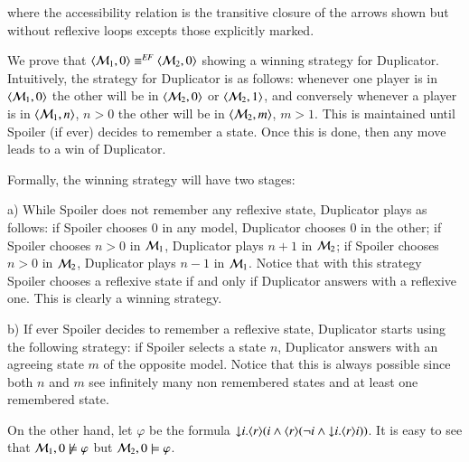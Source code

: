 \begin{pf}
\begin{center}
\end{center}

\noindent where the accessibility relation is the
transitive closure of the arrows shown but without reflexive
loops excepts those explicitly marked.


We prove that $\langle \mathcal{M}_1,0 \rangle\equiv^{\mathit{EF}} \langle \mathcal{M}_2,0 \rangle$ showing a winning
strategy for Duplicator. Intuitively, the strategy for Duplicator
is as follows: whenever one player is in
$\langle \mathcal{M}_1,0 \rangle$ the other will be in $\langle \mathcal{M}_2,0 \rangle$ or
$\langle \mathcal{M}_2,1 \rangle$, and conversely whenever a player is in
$\langle \mathcal{M}_1,n \rangle$, $n>0$ the other will be in $\langle \mathcal{M}_2,m \rangle$, $m>1$.
This is maintained until Spoiler (if ever) decides to remember a
state. Once this is done, then any move leads to a win of Duplicator.

Formally, the winning strategy will have two stages:
\smallskip

\noindent
a) While Spoiler does not remember any reflexive
state, Duplicator plays as follows: if Spoiler
chooses $0$ in any model, Duplicator chooses $0$ in the other;
if Spoiler chooses $n>0$ in $\mathcal{M}_1$, Duplicator plays $n+1$ in
$\mathcal{M}_2$; if Spoiler chooses $n>0$ in $\mathcal{M}_2$, Duplicator plays
$n-1$ in $\mathcal{M}_1$. Notice that with this strategy Spoiler chooses
a reflexive state if and only if Duplicator answers with a reflexive
one. This is clearly a winning strategy.
\smallskip

\noindent
b) If ever Spoiler decides to
remember a reflexive state, Duplicator starts using the following
strategy: if Spoiler selects a state $n$, Duplicator answers with an
agreeing state $m$ of the opposite model. Notice that this is always
possible since both $n$ and $m$ see infinitely many non remembered
states and at least one remembered state.
\smallskip

\noindent
On the other hand, let $\varphi$ be the formula ${\downarrow} i. \langle r \rangle(i
\land \langle r \rangle(\lnot i \land {\downarrow} i.\langle r \rangle i))$. It is easy to see
that $\mathcal{M}_1, 0 \not \models \varphi$ but $\mathcal{M}_2, 0 \models
\varphi$.
\end{pf}

